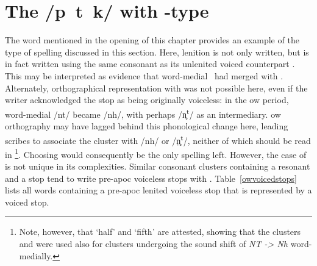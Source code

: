 \section{The /p~t~k/ with -type}
\label{ptkwithbdg}
The word  mentioned in the opening of this chapter provides an example of the type of spelling discussed in this section. Here, lenition is not only written, but is in fact written using the same consonant as its unlenited voiced counterpart . This may be interpreted as evidence that word-medial \lT\ had merged with \xD.  Alternately, orthographical representation with  was not possible here, even if the writer acknowledged the stop as being originally voiceless: in the \gls{ow} period, word-medial /nt/ became /nh/, with perhaps /n̥\textsuperscript{t}/ as an intermediary. \Gls{ow} orthography may have lagged behind this phonological change here, leading scribes to associate the cluster  with /nh/ or /n̥̤\textsuperscript{t}/, neither of which should be read in \footnote{Note, however, that  `half' and  `fifth' are attested, showing that the clusters  and  were used also for clusters undergoing the sound shift of \textit{NT -> Nh} word-medially.}. Choosing  would consequently be the only spelling left. However, the case of  is not unique in its complexities. Similar consonant clusters containing a resonant and a stop tend to write pre-\gls{apoc} voiceless stops with . Table~\ref{owvoicedstops} lists all words containing a pre-\gls{apoc} lenited voiceless stop that is represented by a voiced stop.

